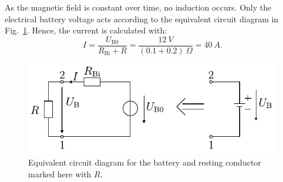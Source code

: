 
\begin{solutionblock}
    As the magnetic field is constant over time, no induction occurs. Only the electrical battery voltage acts according to the equivalent circuit diagram in Fig.~\ref{fig:solution_EquivalentCircuitDiagram}. Hence, the current is calculated with:
    \begin{equation}
        I = \frac{U_{\mathrm{B0}}}{R_{\mathrm{Bi}}+R}
        = \frac{12 \ \si{V}}{(0.1+0.2) \ \si{\Omega}}
        = 40 \ \si{A}.
    \end{equation}

    \begin{figure}[ht]
        \centering
        \includegraphics{fig/ex01/solution_equivalentCircuitDiagram.pdf}
        \caption{Equivalent circuit diagram for the battery and resting conductor marked here with $R$.}
        \label{fig:solution_EquivalentCircuitDiagram}
    \end{figure}

\end{solutionblock}




